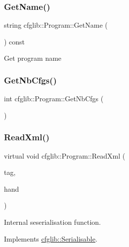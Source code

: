\subsubsection{\texorpdfstring{Get\+Name()}{GetName()}}
{\footnotesize\ttfamily string cfglib\+::\+Program\+::\+Get\+Name (\begin{DoxyParamCaption}{ }\end{DoxyParamCaption}) const}

Get program name \mbox{\label{classcfglib_1_1Program_abd621c3512b0affedf904d6acbe9941b}} 
\subsubsection{\texorpdfstring{Get\+Nb\+Cfgs()}{GetNbCfgs()}}
{\footnotesize\ttfamily int cfglib\+::\+Program\+::\+Get\+Nb\+Cfgs (\begin{DoxyParamCaption}{ }\end{DoxyParamCaption})\hspace{0.3cm}{\ttfamily [inline]}}

\mbox{\label{classcfglib_1_1Program_ad854304f1126c700757fb461a36c8cbd}} 
\subsubsection{\texorpdfstring{Read\+Xml()}{ReadXml()}}
{\footnotesize\ttfamily virtual void cfglib\+::\+Program\+::\+Read\+Xml (\begin{DoxyParamCaption}\item[{\hyperlink{classXmlTag}{Xml\+Tag} const $\ast$}]{tag,  }\item[{\hyperlink{classcfglib_1_1Handle}{Handle} \&}]{hand }\end{DoxyParamCaption})\hspace{0.3cm}{\ttfamily [virtual]}}

Internal seserialisation function. 

Implements \hyperlink{classcfglib_1_1Serialisable_a876d530446317872259356af9b016e13}{cfglib\+::\+Serialisable}.

\mbox{\label{classcfglib_1_1Program_a50b65e054b0e6c2a6517e1f7c8a34379}} 
